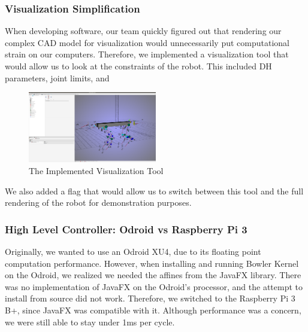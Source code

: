     \subsubsection{Visualization Simplification}
        When developing software, our team quickly figured out that rendering our complex CAD model for visualization would unnecessarily put computational strain on our computers. Therefore, we implemented a visualization tool that would allow us to look at the constraints of the robot. This included DH parameters, joint limits, and
        \begin{figure}
            \centering
       \includegraphics[width=0.5\textwidth]{figures/BowlerVis.png}
            \caption{The Implemented Visualization Tool}
            \label{fig:VisualizationTool}
        \end{figure}
        
        We also added a flag that would allow us to switch between this tool and the full rendering of the robot for demonstration purposes.
    \subsubsection{High Level Controller: Odroid vs Raspberry Pi 3}
        Originally, we wanted to use an Odroid XU4, due to its floating point computation performance. However, when installing and running Bowler Kernel on the Odroid, we realized we needed the affines from the JavaFX library. There was no implementation of JavaFX on the Odroid's processor, and the attempt to install from source did not work. Therefore, we switched to the Raspberry Pi 3 B+, since JavaFX was compatible with it. Although performance was a concern, we were still able to stay under 1ms per cycle.
